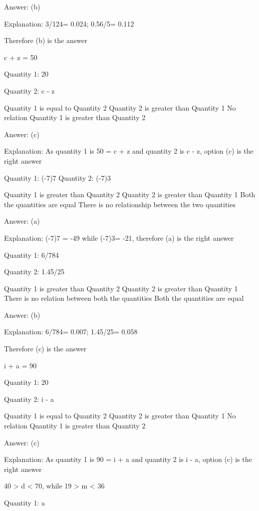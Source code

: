     Answer: (b)

    Explanation: 3/124= 0.024; 0.56/5= 0.112

    Therefore (b) is the answer

    c + z = 50

    Quantity 1: 20

    Quantity 2: c - z

        Quantity 1 is equal to Quantity 2
        Quantity 2 is greater than Quantity 1
        No relation
        Quantity 1 is greater than Quantity 2

    Answer: (c)

    Explanation: As quantity 1 is 50 = c + z and quantity 2 is c - z, option (c) is the right answer

    Quantity 1: (-7)7
    Quantity 2: (-7)3

        Quantity 1 is greater than Quantity 2
        Quantity 2 is greater than Quantity 1
        Both the quantities are equal
        There is no relationship between the two quantities

    Answer: (a)

    Explanation: (-7)7 = -49 while (-7)3= -21, therefore (a) is the right answer

    Quantity 1: 6/784

    Quantity 2: 1.45/25

        Quantity 1 is greater than Quantity 2
        Quantity 2 is greater than Quantity 1
        There is no relation between both the quantities
        Both the quantities are equal

    Answer: (b)

    Explanation: 6/784= 0.007; 1.45/25= 0.058

    Therefore (c) is the answer 



    i + a = 90

    Quantity 1: 20

    Quantity 2: i - a

        Quantity 1 is equal to Quantity 2
        Quantity 2 is greater than Quantity 1
        No relation
        Quantity 1 is greater than Quantity 2

    Answer: (c)

    Explanation: As quantity 1 is 90 = i + a and quantity 2 is i - a, option (c) is the right answer

    40 > d < 70, while 19 > m < 36

    Quantity 1: a

